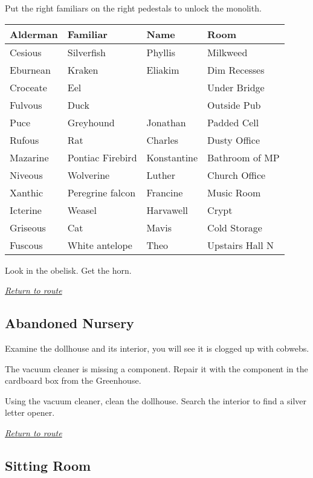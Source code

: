 \documentclass[a5paper]{extarticle}
\begin{document}
Put the right familiars on the right pedestals to unlock the monolith.

\begin{xltabular}[c]{\linewidth}{llll}
\hline
\textbf{Alderman} &
\textbf{Familiar} &
\textbf{Name} &
\textbf{Room} \\
\hline
Cesious & Silverfish & Phyllis & Milkweed \\
Eburnean & Kraken & Eliakim & Dim Recesses \\
Croceate & Eel &  & Under Bridge\\
Fulvous & Duck &  & Outside Pub \\
Puce & Greyhound & Jonathan & Padded Cell \\
Rufous & Rat & Charles & Dusty Office \\
Mazarine & Pontiac Firebird & Konstantine & Bathroom of MP \\
Niveous & Wolverine & Luther & Church Office \\
Xanthic & Peregrine falcon & Francine & Music Room \\
Icterine & Weasel & Harvawell & Crypt \\
Griseous & Cat & Mavis & Cold Storage \\
Fuscous & White antelope & Theo & Upstairs Hall N \\
\hline
\end{xltabular}

Look in the obelisk. Get the horn.

\hyperref[sec:route-13]{\emph{Return to route}}

\newpage
\subsection{Abandoned Nursery}\label{sec:sol-Abandoned-Nursery}

Examine the dollhouse and its interior, you will see it is clogged up with cobwebs.

The vacuum cleaner is missing a component.
Repair it with the component in the cardboard box from the Greenhouse.

Using the vacuum cleaner, clean the dollhouse.
Search the interior to find a silver letter opener.

\hyperref[sec:route-13]{\emph{Return to route}}

\newpage
\subsection{Sitting Room}\label{sec:sol-Sitting-Room}
\end{document}
